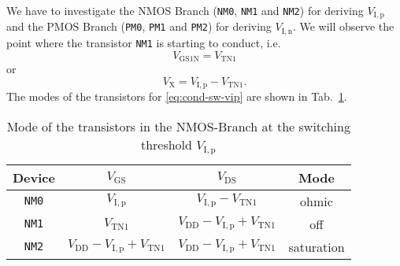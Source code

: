 \documentclass{article}[11pt]
\begin{document}
We have to investigate the NMOS Branch
(\texttt{NM0}, \texttt{NM1} and \texttt{NM2}) for deriving $V_{\mathrm{I,p}}$
and the PMOS Branch (\texttt{PM0}, \texttt{PM1} and \texttt{PM2})
for deriving $V_{\mathrm{I,n}}$.
We will observe the point where the transistor \texttt{NM1} is starting to
conduct, i.e.
\begin{equation}\label{eq:cond-sw-vip}
 V_{\mathrm{GS1N}} = V_{\mathrm{TN1}}
\end{equation}
or
\begin{equation}
  V_{\mathrm{X}} = V_{\mathrm{I,p}} - V_{\mathrm{TN1}}.
\end{equation}
The modes of the transistors for \eqref{eq:cond-sw-vip} are shown in 
Tab.~\ref{tab:mode-nmos-branch}.
\begin{table}[H]
  \centering
  \caption{Mode of the transistors in the NMOS-Branch at the
           switching threshold $V_{\mathrm{I,p}}$}
  \begin{tabular}{|c|c|c|c|}
                                                                                                                                                             \hline
    Device       & $V_{\mathrm{GS}}$                                   & $V_{\mathrm{DS}}$                                     & Mode                     \\ \hline \hline
    \texttt{NM0} & $V_{\mathrm{I,p}}$                                  & $V_{\mathrm{I,p}} - V_{\mathrm{TN1}}$                 & ohmic \footnotemark      \\ \hline
    \texttt{NM1} & $V_{\mathrm{TN1}}$                                  & $V_{\mathrm{DD}}-V_{\mathrm{I,p}}+V_{\mathrm{TN1}}$   & off \footnotemark        \\ \hline   
    \texttt{NM2} & $V_{\mathrm{DD}}-V_{\mathrm{I,p}}+V_{\mathrm{TN1}}$ & $V_{\mathrm{DD}} - V_{\mathrm{I,p}}+V_{\mathrm{TN1}}$ & saturation \footnotemark \\ \hline   
  \end{tabular}
  \label{tab:mode-nmos-branch}
\end{table}
\end{document}
